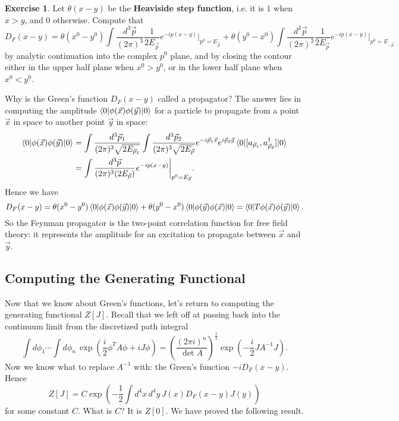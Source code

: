 \documentclass{report}
\theoremstyle{plain}
\theoremstyle{definition}
\newtheorem{exercise}{Exercise}[section]
\theoremstyle{remark}
\begin{document}
\begin{exercise}
  Let $\theta(x - y)$ be the {\bf Heaviside step function}, i.e. it is
  $1$ when $x > y$, and $0$ otherwise. Compute that
  $$ D_F(x - y) = \theta(x^0 - y^0) \int \frac{d^3\vec{p}}{(2\pi)^3} \frac{1}{2E_{\vec p}} e^{-ip(x-y)}\bigg|_{p^0 = E_{\vec p}} + \theta(y^0 - x^0) \int \frac{d^3\vec{p}}{(2\pi)^3} \frac{1}{2E_{\vec p}} e^{-ip(x-y)}\bigg|_{p^0 = E_{-\vec p}} $$
  by analytic continuation into the complex $p^0$ plane, and by
  closing the contour either in the upper half plane when $x^0 > y^0$,
  or in the lower half plane when $x^0 < y^0$.
\end{exercise}

Why is the Green's function $D_F(x - y)$ called a propagator? The
answer lies in computing the amplitude
$\braket{0|\phi(\vec x)\phi(\vec y)|0}$ for a particle to propagate
from a point $\vec{x}$ in space to another point $\vec{y}$ in space:
\begin{align*}
  \braket{0|\phi(\vec x)\phi(\vec y)|0} 
  &= \int \frac{d^3\vec{p}_1}{(2\pi)^3 \sqrt{2E_{\vec{p}_1}}} \int \frac{d^3\vec{p}_2}{(2\pi)^3 \sqrt{2E_{\vec{p}}}} e^{-i\vec{p}_1\vec{x}} e^{i\vec{p}_2\vec{y}} \braket{0|[a_{\vec{p}_1}, a^\dagger_{\vec{p}_2}]|0} \\
  &= \int \frac{d^3\vec{p}}{(2\pi)^3 (2E_{\vec p})} e^{-ip(x - y)}\bigg|_{p^0 = E_{\vec p}}.
\end{align*}
Hence we have
$$ D_F(x - y) = \theta(x^0 - y^0)\braket{0|\phi(\vec x)\phi(\vec y)|0} + \theta(y^0 - x^0)\braket{0|\phi(\vec y)\phi(\vec x)|0} = \braket{0|T\phi(\vec x)\phi(\vec y)|0}. $$
So the Feynman propagator is the two-point correlation function for
free field theory: it represents the amplitude for an excitation to
propagate between $\vec x$ and $\vec y$.

\subsection{Computing the Generating Functional}

Now that we know about Green's functions, let's return to computing
the generating functional $Z[J]$. Recall that we left off at passing
back into the continuum limit from the discretized path integral
$$ \int d\phi_1 \cdots \int d\phi_n \, \exp\left(\frac{i}{2} \phi^T A \phi + iJ\phi\right) = \left(\frac{(2\pi i)^n}{\det A}\right)^{\frac{1}{2}} \exp\left(-\frac{i}{2} JA^{-1}J\right). $$
Now we know what to replace $A^{-1}$ with: the Green's function
$-iD_F(x - y)$. Hence
$$ Z[J] = C \exp\left(-\frac{1}{2} \int d^4x \, d^4y \, J(x) D_F(x - y) J(y)\right) $$
for some constant $C$. What is $C$? It is $Z[0]$. We have proved the
following result.
\end{document}
